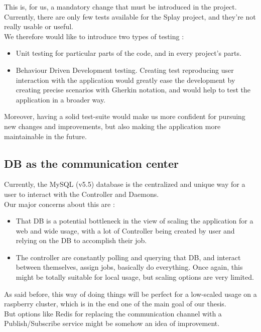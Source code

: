 \documentclass{article}
\begin{document}
    This is, for us, a mandatory change that must be introduced in the project.\\

    Currently, there are only few tests available for the Splay project,
    and they're not really usable or useful.\\
    We therefore would like to introduce two types of testing : \\
    \begin{itemize}
      \item Unit testing for particular parts of the code, and in
      every project's parts.
      \item Behaviour Driven Development testing. Creating test reproducing
      user interaction with the application would greatly ease the development
      by creating precise scenarios with Gherkin notation, and would help
      to test the application in a broader way.
    \end{itemize}

    Moreover, having a solid test-suite would make us more confident for
    pursuing new changes and improvements, but also making the application
    more maintainable in the future.



  \subsection{DB as the communication center}

    Currently, the MySQL (v5.5) database is the centralized and unique way for
    a user to interact with the Controller and Daemons.\\

    Our major concerns about this are : \\
    \begin{itemize}
      \item That DB is a potential bottleneck in the view of scaling the
      application for a web and wide usage, with a lot of Controller being
      created by user and relying on the DB to accomplish their job.
      \item The controller are constantly polling and
      querying that DB, and interact between themselves, assign jobs, basically
      do everything. Once again, this might be totally suitable for local usage,
      but scaling options are very limited.
    \end{itemize}

    As said before, this way of doing things will be perfect for a low-scaled
    usage on a raspberry cluster, which is in the end one of the main goal
    of our thesis.\\
    But options like Redis \cite{redispubsub} for replacing the communication channel with a
    Publish/Subscribe service might be somehow an idea of improvement.
\end{document}

